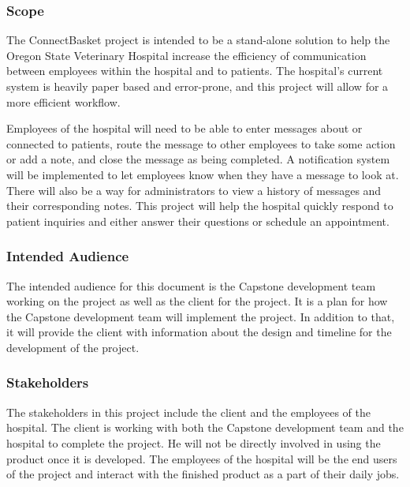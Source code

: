 \documentclass[onecolumn, draftclsnofoot,10pt, compsoc]{IEEEtran}
\begin{document}
\subsubsection{Scope}
The ConnectBasket project is intended to be a stand-alone solution to help the Oregon State Veterinary Hospital increase the efficiency of communication between employees within the hospital and to patients. The hospital's current system is heavily paper based and error-prone, and this project will allow for a more efficient workflow.

Employees of the hospital will need to be able to enter messages about or connected to patients, route the message to other employees to take some action or add a note, and close the message as being completed. A notification system will be implemented to let employees know when they have a message to look at. There will also be a way for administrators to view a history of messages and their corresponding notes. This project will help the hospital quickly respond to patient inquiries and either answer their questions or schedule an appointment.

\subsubsection{Intended Audience}
The intended audience for this document is the Capstone development team working on the project as well as the client for the project. It is a plan for how the Capstone development team will implement the project. In addition to that, it will provide the client with information about the design and timeline for the development of the project.

\subsubsection{Stakeholders}
The stakeholders in this project include the client and the employees of the hospital. The client is working with both the Capstone development team and the hospital to complete the project. He will not be directly involved in using the product once it is developed. The employees of the hospital will be the end users of the project and interact with the finished product as a part of their daily jobs.
\end{document}
